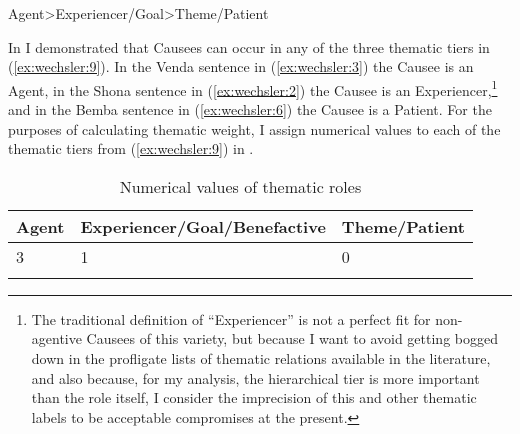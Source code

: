 \documentclass[output=paper,modfonts,nonflat,colorlinks,citecolor=brown]{langsci/langscibook}
\begin{document}
\ea\label{ex:wechsler:9}
 {Agent>Experiencer/Goal>Theme/Patient}\\
\z

In  I demonstrated that Causees can occur in any of the three thematic tiers in (\ref{ex:wechsler:9}). In the Venda sentence in (\ref{ex:wechsler:3}) the Causee is an Agent, in the Shona sentence in (\ref{ex:wechsler:2}) the Causee is an Experiencer,\footnote{The traditional definition of “Experiencer” is not a perfect fit for non-agentive Causees of this variety, but because I want to avoid getting bogged down in the profligate lists of thematic relations available in the literature, and also because, for my analysis, the hierarchical tier is more important than the role itself, I consider the imprecision of this and other thematic labels to be acceptable compromises at the present.}  and in the Bemba sentence in (\ref{ex:wechsler:6}) the Causee is a Patient. For the purposes of calculating thematic weight, I assign numerical values to each of the thematic tiers from (\ref{ex:wechsler:9}) in .

\begin{table}
\begin{tabular}{lll}
\lsptoprule
 Agent & Experiencer/Goal/Benefactive & Theme/Patient\\
 \midrule
 3 & 1 & 0\\
\lspbottomrule
\end{tabular}
\caption{Numerical values of thematic roles}
\label{tab:wechsler:1}
\end{table}
\end{document}
